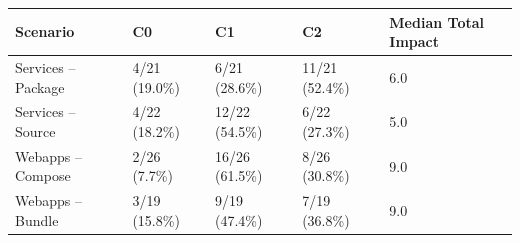 \begin{tabular*}{\tblwidth}{@{} LLLLL@{} }
\toprule
Scenario & C0 & C1 & C2 & Median Total Impact\\
\midrule
Services – Package & 4/21 (19.0\%) & 6/21 (28.6\%) & 11/21 (52.4\%) & 6.0 \\
Services – Source & 4/22 (18.2\%) & 12/22 (54.5\%) & 6/22 (27.3\%) & 5.0 \\
Webapps – Compose & 2/26 (7.7\%) & 16/26 (61.5\%) & 8/26 (30.8\%) & 9.0 \\
Webapps – Bundle & 3/19 (15.8\%) & 9/19 (47.4\%) & 7/19 (36.8\%) & 9.0 \\
\bottomrule
\end{tabular*}